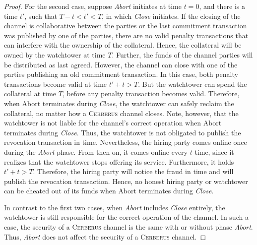 \documentclass[twocolumn,showpacs,%
  nofootinbib,aps,superscriptaddress,%
  eqsecnum,prd,notitlepage,showkeys,10pt]{revtex4-1}
\newcommand{\sys}{\textsc{Cerberus}\xspace}
\begin{document}
\begin{proof}
For the second case, suppose \textit{Abort} initiates at time $t=0$, and there is a time $t'$, such that $T-t < t'< T$, in which \textit{Close} initiates.
If the closing of the channel is collaborative between the parties or the last commitment transaction was published by one of the parties, there are no valid penalty transactions that can interfere with the ownership of the collateral. Hence, the collateral will be owned by the watchtower at time $T$.
Further, the funds of the channel parties will be distributed as last agreed.
However, the channel can close with one of the parties publishing an old commitment transaction.
In this case, both penalty transactions become valid at time $t'+t>T$. But the watchtower can spend the collateral at time $T$, before any penalty transaction becomes valid.
Therefore, when {Abort} terminates during \textit{Close}, the watchtower can safely reclaim the collateral, no matter how a \sys channel closes.
Note, however, that the watchtower is not liable for the channel's correct operation when {Abort} terminates during \textit{Close}.
Thus, the watchtower is not obligated to publish the revocation transaction in time.
Nevertheless, the hiring party comes online once during the \textit{Abort} phase. From then on, it comes online every $t$ time, since it realizes that the watchtower stops offering its service. Furthermore, it holds $t'+t>T$.
Therefore, the hiring party will notice the fraud in time and will publish the revocation transaction.
Hence, no honest hiring party or watchtower can be cheated out of its funds when {Abort} terminates during \textit{Close}.


In contrast to the first two cases, when \textit{Abort} includes \textit{Close} entirely, the watchtower is still responsible for the correct operation of the channel.
In such a case, the security of a \sys channel is the same with or without phase \textit{Abort}.
Thus, \textit{Abort} does not affect the security of a \sys channel.
\end{proof}
\end{document}
